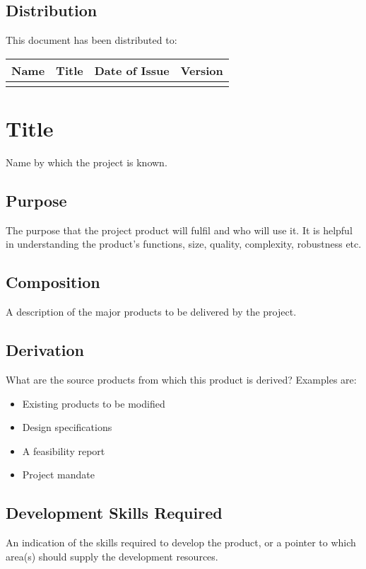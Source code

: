\documentclass{report}
\begin{document}
\section{Distribution}
This document has been distributed to:

\begin{center}
    \begin{tabular}{| p{2cm} | l | p{2cm} | p{2cm} |}
    \hline
    Name & Title & Date of Issue & Version \\
    \hline
     & & & \\
    \hline
    \end{tabular}
\end{center}

\tableofcontents

\chapter{Title}
Name by which the project is known.

\section{Purpose}
The purpose that the project product will fulfil and who will use it. It is helpful in understanding the product's functions, size, quality, complexity, robustness etc.

\section{Composition}
A description of the major products to be delivered by the project.

\section{Derivation}
What are the source products from which this product is derived? Examples are:
\begin{itemize}
\item Existing products to be modified
\item Design specifications
\item A feasibility report
\item Project mandate
\end{itemize}

\section{Development Skills Required}
An indication of the skills required to develop the product, or a pointer to which area(s) should supply the development resources.
\end{document}
